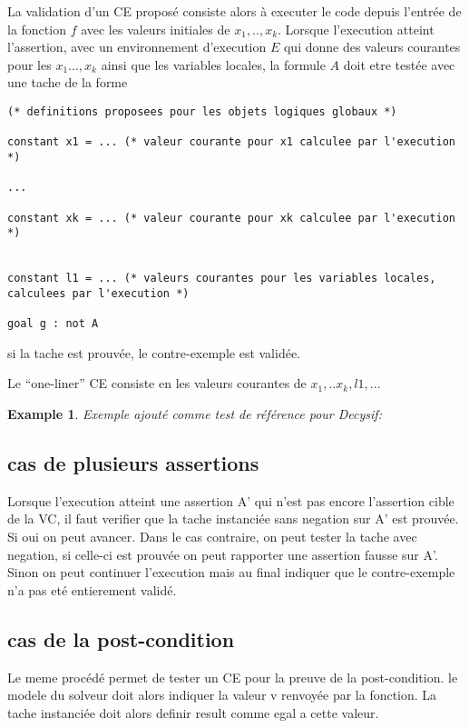 \documentclass[a4paper,twoside]{article}
\newtheorem{example}[definition]{Example}
\begin{document}
La validation d'un CE proposé consiste alors à executer le code depuis l'entrée
de la fonction $f$ avec les valeurs initiales de $x_1,..,x_k$. Lorsque l'execution atteint l'assertion, avec un environnement d'execution $E$ qui donne des valeurs courantes pour les $x_1...,x_k$ ainsi que les variables locales, la formule $A$ doit etre testée avec une tache de la forme
\begin{lstlisting}
(* definitions proposees pour les objets logiques globaux *)

constant x1 = ... (* valeur courante pour x1 calculee par l'execution *)

...

constant xk = ... (* valeur courante pour xk calculee par l'execution *)


constant l1 = ... (* valeurs courantes pour les variables locales, calculees par l'execution *)

goal g : not A
\end{lstlisting}
si la tache est prouvée, le contre-exemple est validée.

Le ``one-liner'' CE consiste en les valeurs courantes de $x_1,..x_k,l1,...$



\begin{example}
Exemple ajouté comme test de référence pour Decysif:


\end{example}

\subsection{cas de plusieurs assertions}

Lorsque l'execution atteint une assertion A' qui n'est pas encore l'assertion
cible de la VC, il faut verifier que la tache instanciée sans negation sur A'
est prouvée. Si oui on peut avancer. Dans le cas contraire, on peut tester la
tache avec negation, si celle-ci est prouvée on peut rapporter une assertion
fausse sur A'. Sinon on peut continuer l'execution mais au final indiquer que le
contre-exemple n'a pas eté entierement validé.


\subsection{cas de la post-condition}

Le meme procédé permet de tester un CE pour la preuve de la post-condition. le
modele du solveur doit alors indiquer la valeur v renvoyée par la fonction. La
tache instanciée doit alors definir result comme egal a cette valeur.
\end{document}
